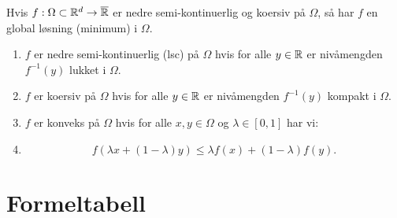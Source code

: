 Hvis \(f: \Omega \subset \mathbb{R}^d \to \overline{\mathbb{R}}\) er nedre semi-kontinuerlig og koersiv på \(\Omega\), så har \(f\) en global løsning (minimum) i \(\Omega\).

\begin{enumerate}
  \item \(f\) er nedre semi-kontinuerlig (lsc) på \(\Omega\) hvis for alle \(y \in \mathbb{R}\) er nivåmengden \(f^{-1}(y)\) lukket i \(\Omega\).
  \item \(f\) er koersiv på \(\Omega\) hvis for alle \(y \in \mathbb{R}\) er nivåmengden \(f^{-1}(y)\) kompakt i \(\Omega\).
  \item \(f\) er konveks på \(\Omega\) hvis for alle \(x, y \in \Omega\) og \(\lambda \in [0, 1]\) har vi:
  \item
        \[
          f(\lambda x + (1 - \lambda)y) \leq \lambda f(x) + (1 - \lambda)f(y).
        \]
\end{enumerate}

\clearpage

\section{Formeltabell}

